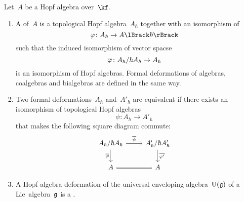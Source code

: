 \documentclass[a4paper, 11pt, oneside]{scrartcl}
\begin{document}
\begin{definition}
  \label{definition of more general deformations}
  Let~$A$ be a Hopf algebra over~$\kf$.
  \begin{enumerate}
    \item
      A  of~$A$ is a topological Hopf algebra~$A_{\hbar}$ together with an isomorphism of~\modules{$\kfhbar$}
      \[
        \varphi
        \colon
        A_{\hbar}
        \to
        \power{A}{\hbar}
      \]
      such that the induced isomorphism of vector spacse
      \[
        \overline{\varphi}
        \colon
        A_{\hbar} / \hbar A_{\hbar}
        \to
        A_{\hbar}
      \]
      is an isomorphism of Hopf algebras.
      Formal deformations of algebras, coalgebras and bialgebras are defined in the same way.
    \item
      Two formal deformations~$A_{\hbar}$ and~$A'_{\hbar}$ are equivalent if there exists an isomorphism of topological Hopf algebras
      \[
        \psi
        \colon
        A_{\hbar}
        \to
        A'_{\hbar}
      \]
      that makes the following square diagram commute:
      \[
        \begin{tikzcd}
          A_{\hbar} / \hbar A_{\hbar}
          \arrow{r}[above]{\induced{\psi}}
          \arrow{d}[left]{\induced{\varphi}}
          &
          A'_{\hbar} / \hbar A'_{\hbar}
          \arrow{d}[right]{\induced{\varphi'}}
          \\
          A
          \arrow[equal]{r}
          &
          A
        \end{tikzcd}
      \]
    \item
      A Hopf algebra deformation of the universal enveloping algebra~$\operatorname{U}(\mathfrak{g})$ of a Lie~algebra~$\mathfrak{g}$ is a .
  \end{enumerate}
\end{definition}
\end{document}
